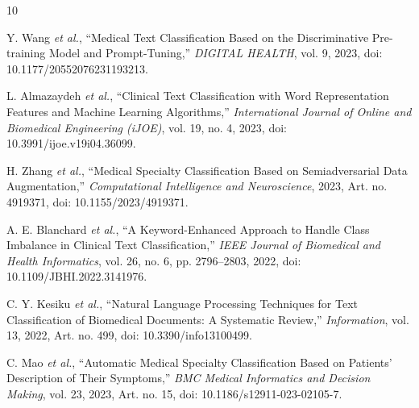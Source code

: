 \documentclass[12pt,a4paper]{report}
\begin{document}
\renewcommand\bibname{References}
\begin{thebibliography}{10}

Y. Wang \textit{et al.}, ``Medical Text Classification Based on the Discriminative Pre-training Model and Prompt-Tuning,'' \textit{DIGITAL HEALTH}, vol. 9, 2023, doi: 10.1177/20552076231193213.

L. Almazaydeh \textit{et al.}, ``Clinical Text Classification with Word Representation Features and Machine Learning Algorithms,'' \textit{International Journal of Online and Biomedical Engineering (iJOE)}, vol. 19, no. 4, 2023, doi: 10.3991/ijoe.v19i04.36099.

H. Zhang \textit{et al.}, ``Medical Specialty Classification Based on Semiadversarial Data Augmentation,'' \textit{Computational Intelligence and Neuroscience}, 2023, Art. no. 4919371, doi: 10.1155/2023/4919371.

A. E. Blanchard \textit{et al.}, ``A Keyword-Enhanced Approach to Handle Class Imbalance in Clinical Text Classification,'' \textit{IEEE Journal of Biomedical and Health Informatics}, vol. 26, no. 6, pp. 2796--2803, 2022, doi: 10.1109/JBHI.2022.3141976.

C. Y. Kesiku \textit{et al.}, ``Natural Language Processing Techniques for Text Classification of Biomedical Documents: A Systematic Review,'' \textit{Information}, vol. 13, 2022, Art. no. 499, doi: 10.3390/info13100499.

C. Mao \textit{et al.}, ``Automatic Medical Specialty Classification Based on Patients' Description of Their Symptoms,'' \textit{BMC Medical Informatics and Decision Making}, vol. 23, 2023, Art. no. 15, doi: 10.1186/s12911-023-02105-7.

\end{thebibliography}
\end{document}
